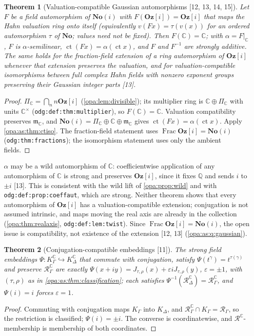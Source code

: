 \documentclass[11pt,oneside]{article}
\numberwithin{equation}{section}
\newtheorem{theorem}{Theorem}[section]
\theoremstyle{definition}
\theoremstyle{remark}
\newcommand{\No}{\mathbf{No}}
\newcommand{\Og}{\mathbf{Oz}[i]}
\newcommand{\SC}{\mathbf{No}(i)}
\newcommand{\C}{\mathbb C}
\newcommand{\Q}{\mathbb Q}
\newcommand{\mm}{\mathfrak m}
\newcommand{\ct}{\operatorname{ct}}
\newcommand{\Frac}{\operatorname{Frac}}
\newcommand{\src}[1]{\textup{\textsf{\small[#1]}}}
\newcommand{\lbl}[1]{\nolinkurl{#1}}
\begin{document}
\begin{theorem}[Valuation-compatible Gaussian automorphisms \src{12, 13, 14, 15}]\label{opa:as:thm:gaussian}
Let $F$ be a field automorphism of $\SC$ with $F(\Og)=\Og$ that maps the Hahn valuation ring onto itself
(equivalently $v(Fx)=\tau(v(x))$ for an ordered automorphism $\tau$ of $\No$; values need not be fixed). Then $F(\C)=\C$;
with $\alpha=F|_\C$, $F$ is $\alpha$-semilinear, $\ct(Fx)=\alpha(\ct x)$, and $F$ and $F^{-1}$ are strongly additive. The
same holds for the fraction-field extension of a ring automorphism of $\Og$ whenever that extension preserves the
valuation, and for valuation-compatible isomorphisms between full complex Hahn fields with nonzero exponent groups
preserving their Gaussian integer parts \src{13}.
\end{theorem}
\begin{proof}
$\Pi_\C=\bigcap_nn\Og$ (\cref{opa:lem:divisible}); its multiplier ring is $\C\oplus\Pi_\C$ with units $\C^\times$
(\lbl{odg:def:thm:multiplier}), so $F(\C)=\C$. Valuation compatibility preserves $\mm_\C$, and
$\SC=\Pi_\C\oplus\C\oplus\mm_\C$ gives $\ct(Fx)=\alpha(\ct x)$. Apply \cref{opa:as:thm:ctiso}. The fraction-field
statement uses $\Frac\Og=\SC$ (\lbl{odg:thm:fractions}); the isomorphism statement uses only the ambient fields.
\end{proof}

$\alpha$ may be a wild automorphism of $\C$: coefficientwise application of any automorphism of $\C$ is strong and
preserves $\Og$, since it fixes $\Q$ and sends $i$ to $\pm i$ \src{13}. This is consistent with the wild lift of
\cref{opa:prop:wild} and with \lbl{odg:def:prop:coeffaut}, which are strong. Neither theorem shows that every
automorphism of $\Og$ has a valuation-compatible extension; conjugation is not assumed intrinsic, and maps moving
the real axis are already in the collection (\cref{opa:thm:realaxis}, \lbl{odg:def:lem:twist}). Since
$\Frac\Og=\SC$, the open issue is compatibility, not existence of the extension \src{12, 13}
(\cref{opa:as:q:gaussian}).

\begin{theorem}[Conjugation-compatible embeddings \src{11}]\label{opa:as:thm:complexembed}
The strong field embeddings $\Psi:K^\C_\Gamma\hookrightarrow K^\C_\Delta$ that commute with conjugation, satisfy
$\Psi(t^\gamma)=t^{\tau(\gamma)}$ and preserve $\mathcal R^\C_\Gamma$ are exactly
$\Psi(x+iy)=J_{\tau,\rho}(x)+\varepsilon iJ_{\tau,\rho}(y)$, $\varepsilon=\pm1$, with $(\tau,\rho)$ as in
\cref{opa:as:thm:classification}; each satisfies $\Psi^{-1}(\mathcal R^\C_\Delta)=\mathcal R^\C_\Gamma$, and $\Psi(i)=i$
forces $\varepsilon=1$.
\end{theorem}
\begin{proof}
Commuting with conjugation maps $K_\Gamma$ into $K_\Delta$, and $\mathcal R^\C_\Gamma\cap K_\Gamma=\mathcal R_\Gamma$, so
the restriction is classified; $\Psi(i)=\pm i$. The converse is coordinatewise, and $\mathcal R^\C$-membership is
membership of both coordinates.
\end{proof}
\end{document}
